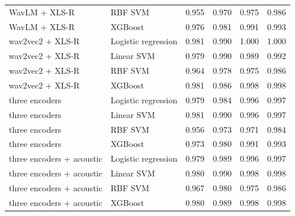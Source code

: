 \documentclass[10pt,a4paper]{article}
\begin{document}
\begin{center}
\begin{longtable}{p{3.6cm}p{2.4cm}rrrr}
WavLM + XLS-R & RBF SVM & 0.955 & 0.970 & 0.975 & 0.986\\
WavLM + XLS-R & XGBoost & 0.976 & 0.981 & 0.991 & 0.993\\
wav2vec2 + XLS-R & Logistic regression & 0.981 & 0.990 & 1.000 & 1.000\\
wav2vec2 + XLS-R & Linear SVM & 0.979 & 0.990 & 0.989 & 0.992\\
wav2vec2 + XLS-R & RBF SVM & 0.964 & 0.978 & 0.975 & 0.986\\
wav2vec2 + XLS-R & XGBoost & 0.981 & 0.986 & 0.998 & 0.998\\
three encoders & Logistic regression & 0.979 & 0.984 & 0.996 & 0.997\\
three encoders & Linear SVM & 0.981 & 0.990 & 0.996 & 0.997\\
three encoders & RBF SVM & 0.956 & 0.973 & 0.971 & 0.984\\
three encoders & XGBoost & 0.973 & 0.980 & 0.991 & 0.993\\
three encoders + acoustic & Logistic regression & 0.979 & 0.989 & 0.996 & 0.997\\
three encoders + acoustic & Linear SVM & 0.980 & 0.990 & 0.998 & 0.998\\
three encoders + acoustic & RBF SVM & 0.967 & 0.980 & 0.975 & 0.986\\
three encoders + acoustic & XGBoost & 0.980 & 0.989 & 0.998 & 0.998\\
\end{longtable}\end{center}
\end{document}
